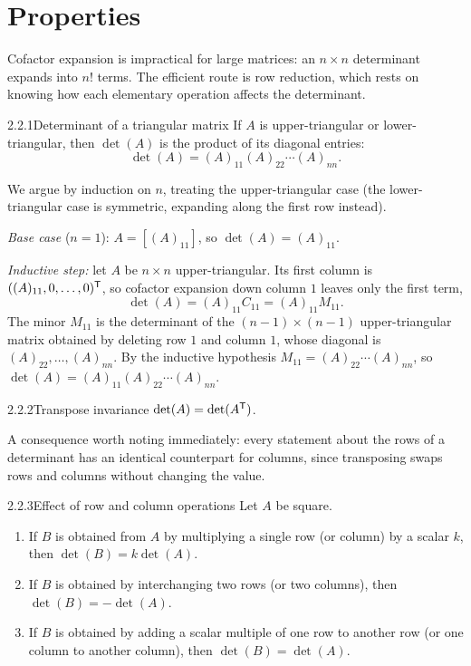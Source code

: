 \section{Properties}
\label{sec:2.2}

Cofactor expansion is impractical for large matrices: an $n\times n$ determinant expands into $n!$ terms. The efficient route is row reduction, which rests on knowing how each elementary operation affects the determinant.

\begin{lems}{2.2.1}{Determinant of a triangular matrix}
If $A$ is upper-triangular or lower-triangular, then $\det(A)$ is the product of its diagonal entries:
\[
\det(A)=(A)_{11}(A)_{22}\cdots(A)_{nn}.
\]
\end{lems}

\begin{prf}
We argue by induction on $n$, treating the upper-triangular case (the lower-triangular case is symmetric, expanding along the first row instead).

\emph{Base case} ($n=1$): $A=[(A)_{11}]$, so $\det(A)=(A)_{11}$.

\emph{Inductive step:} let $A$ be $n\times n$ upper-triangular. Its first column is $((A)_{11},0,\dots,0)^{\mathsf{T}}$, so cofactor expansion down column $1$ leaves only the first term,
\[
\det(A)=(A)_{11}C_{11}=(A)_{11}M_{11}.
\]
The minor $M_{11}$ is the determinant of the $(n-1)\times(n-1)$ upper-triangular matrix obtained by deleting row $1$ and column $1$, whose diagonal is $(A)_{22},\dots,(A)_{nn}$. By the inductive hypothesis $M_{11}=(A)_{22}\cdots(A)_{nn}$, so $\det(A)=(A)_{11}(A)_{22}\cdots(A)_{nn}$.
\end{prf}

\begin{thms}{2.2.2}{Transpose invariance}
$\det(A)=\det(A^{\mathsf{T}})$.
\end{thms}

\begin{proofomit}[MTH2025]A consequence worth noting immediately: every statement about the rows of a determinant has an identical counterpart for columns, since transposing swaps rows and columns without changing the value.
\end{proofomit}

\begin{thms}{2.2.3}{Effect of row and column operations}
Let $A$ be square.
\begin{enumerate}[label=\textup{(\alph*)},leftmargin=2.2em,itemsep=1pt]
\item If $B$ is obtained from $A$ by multiplying a single row (or column) by a scalar $k$, then $\det(B)=k\det(A)$.
\item If $B$ is obtained by interchanging two rows (or two columns), then $\det(B)=-\det(A)$.
\item If $B$ is obtained by adding a scalar multiple of one row to another row (or one column to another column), then $\det(B)=\det(A)$.
\end{enumerate}
\end{thms}


